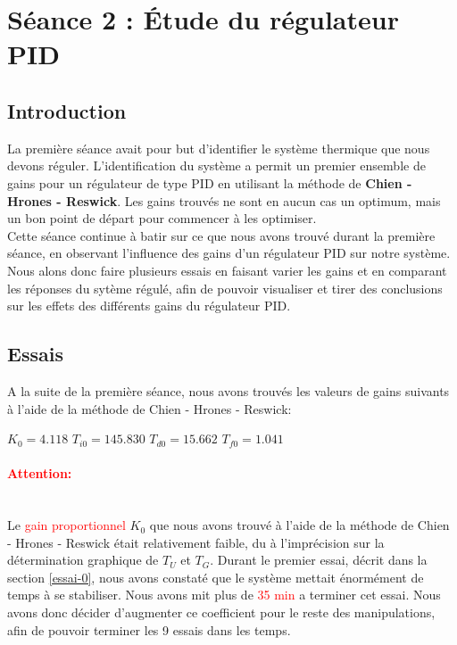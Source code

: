 \section{Séance 2 : \'Etude du régulateur PID}
\subsection{Introduction}
La première séance avait pour but d'identifier le système thermique que nous
devons réguler. L'identification du système a permit un premier ensemble de gains
pour un régulateur de type PID en utilisant la méthode de 
\textbf{Chien - Hrones - Reswick}. Les gains trouvés ne sont en aucun cas un optimum,
mais un bon point de départ pour commencer à les optimiser.\\

Cette séance continue à batir sur ce que nous avons trouvé durant la première séance,
en observant l'influence des gains d'un régulateur PID sur notre système. 
Nous alons donc faire plusieurs essais en faisant varier les gains et en comparant
les réponses du sytème régulé, afin de pouvoir visualiser et tirer des conclusions
sur les effets des différents gains du régulateur PID.
 

\subsection{Essais}
A la suite de la première séance, nous avons trouvés les valeurs de gains suivants
à l'aide de la méthode de Chien - Hrones - Reswick:

\begin{center}
    $K_0  = 4.118$
    \hspace{1cm}
    $T_{i0} = 145.830$
    \hspace{1cm}
    $T_{d0} = 15.662$
    \hspace{1cm}
    $T_{f0} = 1.041$
\end{center}

\paragraph{\textcolor{red}{Attention:}}\mbox{}\\
Le \textcolor{red}{gain proportionnel} $K_0$ que nous avons trouvé à l'aide de la méthode de 
Chien - Hrones - Reswick était relativement faible, du à l'imprécision 
sur la détermination graphique de $T_{U}$ et $T_{G}$. Durant le premier essai,
décrit dans la section \ref{essai-0}, nous avons constaté que le système mettait
énormément de temps à se stabiliser. Nous avons mit plus de \textcolor{red}{35 min}
a terminer cet essai. Nous avons donc décider d'augmenter ce coefficient pour le
reste des manipulations, afin de pouvoir terminer les 9 essais dans les temps.\\

